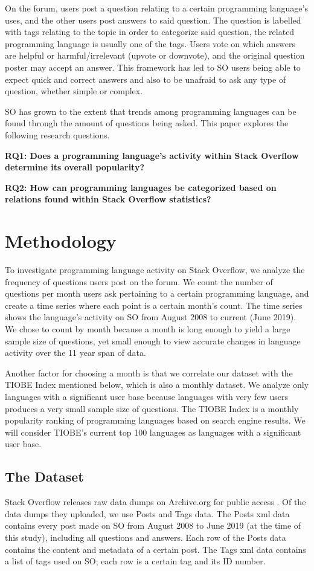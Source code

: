\documentclass[conference]{IEEEtran}
\begin{document}
On the forum, users post a question relating to a certain programming language's uses, and the other users post answers to said question. The question is labelled with tags relating to the topic in order to categorize said question, the related programming language is usually one of the tags. Users vote on which answers are  helpful or harmful/irrelevant (upvote or downvote), and the original question poster may accept an answer. This framework has led to SO users being able to expect quick and correct answers and also to be unafraid to ask any type of question, whether simple or complex.

SO has grown to the extent that trends among programming languages can be found through the amount of questions being asked. This paper explores the following research questions.

\textbf{RQ1: Does a programming language's activity within Stack Overflow determine its overall popularity?}

\textbf{RQ2: How can programming languages be categorized based on relations found within Stack Overflow statistics?}

\section{Methodology}
To investigate programming language activity on Stack Overflow, we analyze the frequency of questions users post on the forum. We count the number of questions per month users ask pertaining to a certain programming language, and create a time series where each point is a certain month's count. The time series shows the language's activity on SO from August 2008 to current (June 2019). We chose to count by month because a month is long enough to yield a large sample size of questions, yet small enough to view accurate changes in language activity over the 11 year span of data.

Another factor for choosing a month is that we correlate our dataset with the TIOBE Index mentioned below, which is also a monthly dataset. We analyze only languages with a significant user base because languages with very few users produces a very small sample size of questions. The TIOBE Index is a monthly popularity ranking of programming languages based on search engine results. We will consider TIOBE's current top 100 languages as languages with a significant user base.


\subsection{The Dataset}
Stack Overflow releases raw data dumps on Archive.org for public access \cite{datadump}. Of the data dumps they uploaded, we use Posts and Tags data. The Posts xml data contains every post made on SO from August 2008 to June 2019 (at the time of this study), including all questions and answers. Each row of the Posts data contains the content and metadata of a certain post. The Tags xml data contains a list of tags used on SO; each row is a certain tag and its ID number.
\end{document}
